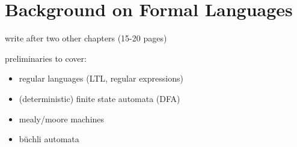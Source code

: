 \section{Background on Formal Languages}

\begin{notes}
    write after two other chapters (15-20 pages)

    preliminaries to cover:

    \begin{itemize}
        \item regular languages (LTL, regular expressions)
        \item (deterministic) finite state automata (DFA)
        \item mealy/moore machines
        \item büchli automata
    \end{itemize}
\end{notes}